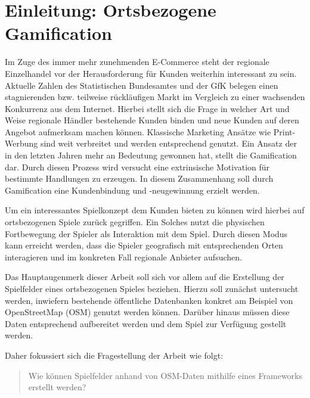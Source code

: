 \chapter{Einleitung: Ortsbezogene Gamification}
\label{ch1:Einleitung}

Im Zuge des immer mehr zunehmenden E-Commerce steht der regionale Einzelhandel vor der Herausforderung für Kunden weiterhin interessant zu sein. Aktuelle Zahlen des Statistischen Bundesamtes \citep{DWN.2012} und der GfK belegen einen stagnierenden bzw. teilweise rückläufigen Markt im Vergleich zu einer wachsenden Konkurrenz aus dem Internet.
Hierbei stellt sich die Frage in welcher Art und Weise regionale Händler bestehende Kunden binden und neue Kunden auf deren Angebot aufmerksam machen können.
Klassische Marketing Ansätze wie Print-Werbung sind weit verbreitet und werden entsprechend genutzt.
Ein Ansatz der in den letzten Jahren mehr an Bedeutung gewonnen hat, stellt die Gamification dar. Durch diesen Prozess wird versucht eine extrinsische Motivation für bestimmte Handlungen zu erzeugen. In diesem Zusammenhang soll durch Gamification eine Kundenbindung und -neugewinnung erzielt werden.

Um ein interessantes Spielkonzept dem Kunden bieten zu können wird hierbei auf ortsbezogenen Spiele zurück gegriffen.
Ein Solches nutzt die physischen Fortbewegung der Spieler als Interaktion mit dem Spiel.
Durch diesen Modus kann erreicht werden, dass die Spieler geografisch mit entsprechenden Orten interagieren und im konkreten Fall regionale Anbieter aufsuchen.

Das Hauptaugenmerk dieser Arbeit soll sich vor allem auf die Erstellung der Spielfelder eines ortsbezogenen Spieles beziehen. Hierzu soll zunächst untersucht werden, inwiefern bestehende öffentliche Datenbanken konkret am Beispiel von OpenStreetMap (OSM) genutzt werden können. Darüber hinaus müssen diese Daten entsprechend aufbereitet werden und dem Spiel zur Verfügung gestellt werden.

Daher fokussiert sich die Fragestellung der Arbeit wie folgt:
\begin{quote}
\item Wie können Spielfelder anhand von OSM-Daten mithilfe eines Frameworks erstellt werden?
\end{quote}
\vspace{1cm}

